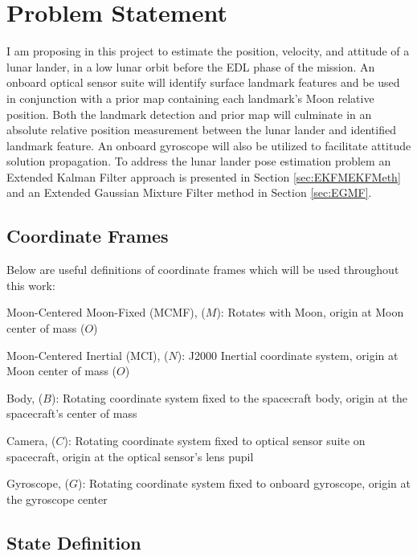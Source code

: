 \documentclass[conf]{new-aiaa}
\begin{document}
\section{Problem Statement}

I am proposing in this project to estimate the position, velocity, and attitude of a lunar lander, in a low lunar orbit before the EDL phase of the mission. An onboard optical sensor suite will identify surface landmark features and be used in conjunction with a prior map containing each landmark's Moon relative position. Both the landmark detection and prior map will culminate in an absolute relative position measurement between the lunar lander and identified landmark feature. An onboard gyroscope will also be utilized to facilitate attitude solution propagation. To address the lunar lander pose estimation problem an Extended Kalman Filter approach is presented in Section \ref{sec:EKFMEKFMeth} and an Extended Gaussian Mixture Filter method in Section \ref{sec:EGMF}.



\subsection{Coordinate Frames}

Below are useful definitions of coordinate frames which will be used throughout this work:

Moon-Centered Moon-Fixed (MCMF), ($M$): Rotates with Moon, origin at Moon center of mass ($O$)

Moon-Centered Inertial (MCI), ($N$): J2000 Inertial coordinate system, origin at Moon center of mass ($O$)

Body, ($B$): Rotating coordinate system fixed to the spacecraft body, origin at the spacecraft's center of mass

Camera, ($C$): Rotating coordinate system fixed to optical sensor suite on spacecraft, origin at the optical sensor's lens pupil

Gyroscope, ($G$): Rotating coordinate system fixed to onboard gyroscope, origin at the gyroscope center


\subsection{State Definition}
\end{document}
